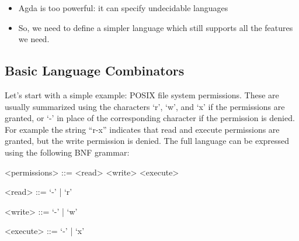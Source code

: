 \begin{itemize}
\item Agda is too powerful: it can specify undecidable languages 
\item So, we need to define a simpler language which still supports all the features we need.
\end{itemize}

\subsection{Basic Language Combinators}

Let's start with a simple example: POSIX file system permissions. These are usually summarized using the characters `r', `w', and `x' if the permissions are granted, or `-' in place of the corresponding character if the permission is denied. For example the string ``r-x'' indicates that read and execute permissions are granted, but the write permission is denied. The full language can be expressed using the following BNF grammar:

\begin{grammar}
<permissions>  ::= <read> <write> <execute>

<read>         ::= `-' | `r'

<write>        ::= `-' | `w'

<execute>      ::= `-' | `x'
\end{grammar}

\begin{code}[hide]%
\>[0]\AgdaSpace{}%
\AgdaSpace{}%
\AgdaSpace{}%
\AgdaSpace{}%
\AgdaSymbol{:}\AgdaSpace{}%
\<%
\\
%
\\[\AgdaEmptyExtraSkip]%
\>[0]\AgdaSpace{}%
\AgdaSpace{}%
\<%
\end{code}


